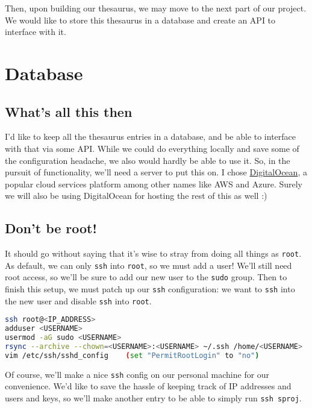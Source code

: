 \documentclass[11pt, twoside, reqno]{book}
\begin{document}
Then, upon building our thesaurus, we may move to the next part of our project. We would like to store this thesaurus in a database and create an API to interface with it.


\chapter{Database}



\section{What's all this then}

I'd like to keep all the thesaurus entries in a database, and be able to interface with that via some API. While we could do everything locally and save some of the configuration headache, we also would hardly be able to use it. So, in the pursuit of functionality, we'll need a server to put this on. I chose \href{https://www.digitalocean.com}{DigitalOcean}, a popular cloud services platform among other names like AWS and Azure. Surely we will also be using DigitalOcean for hosting the rest of this as well :)

\section{Don't be root!}

It should go without saying that it's wise to stray from doing all things as \texttt{root}. As default, we can only \texttt{ssh} into \texttt{root}, so we must add a user! We'll still need root access, so we'll be sure to add our new user to the \texttt{sudo} group. Then to finish this setup, we must patch up our \texttt{ssh} configuration: we want to \texttt{ssh} into the new user and disable \texttt{ssh} into \texttt{root}.
\begin{lstlisting}[language=sh]
ssh root@<IP_ADDRESS>
adduser <USERNAME>
usermod -aG sudo <USERNAME> 
rsync --archive --chown=<USERNAME>:<USERNAME> ~/.ssh /home/<USERNAME> 
vim /etc/ssh/sshd_config    (set "PermitRootLogin" to "no")
\end{lstlisting}

Of course, we'll make a nice \texttt{ssh} config on our personal machine for our convenience. We'd like to save the hassle of keeping track of IP addresses and users and keys, so we'll make another entry to be able to simply run \texttt{ssh sproj}.
\end{document}
